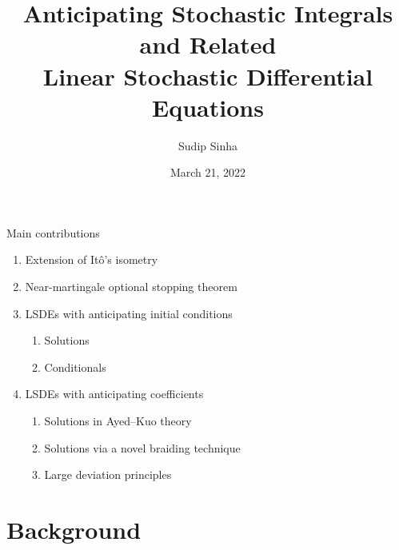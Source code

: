 \documentclass[
    t,
    aspectratio=169,
    xcolor={
        svgnames,
        table,
        hyperref,
    },
    hyperref={
        pdfusetitle,    %
        pdfauthor={Sudip Sinha},    %
        pdfsubject={doctoral defense},    %
        pdfkeywords={defense, dissertation, thesis, doctorate},    %
        pdfstartview=Fit,    %
        pdfpagelayout=SinglePage,    %
        bookmarks=true,
        unicode=true,
        colorlinks=true,
        linktoc=all,
        hyperfootnotes=false,
        breaklinks=true,    %
        linkcolor=Navy,
        urlcolor=IndianRed,
        citecolor=structure.fg,
    },
]{beamer}
\title[Doctoral Defense]{Anticipating Stochastic Integrals\\
and Related\\
Linear Stochastic Differential Equations}
\author{Sudip Sinha}
\institute[LSU]{Louisiana State University}
\date[2022-03-21]{March 21, 2022}
\theoremstyle{definition}
\begin{document}
\begin{frame}[plain]
    \titlepage
\end{frame}



\begin{frame}{Main contributions}
    \begin{enumerate}
        \item  Extension of Itô's isometry
        \item  Near-martingale optional stopping theorem
        \item  LSDEs with anticipating initial conditions
        \begin{enumerate}
            \item  Solutions
            \item  Conditionals
        \end{enumerate}
        \item  LSDEs with anticipating coefficients
        \begin{enumerate}
            \item  Solutions in Ayed–Kuo theory
            \item  Solutions via a novel braiding technique
            \item  Large deviation principles
        \end{enumerate}
    \end{enumerate}
\end{frame}


\section{Background}
\end{document}
